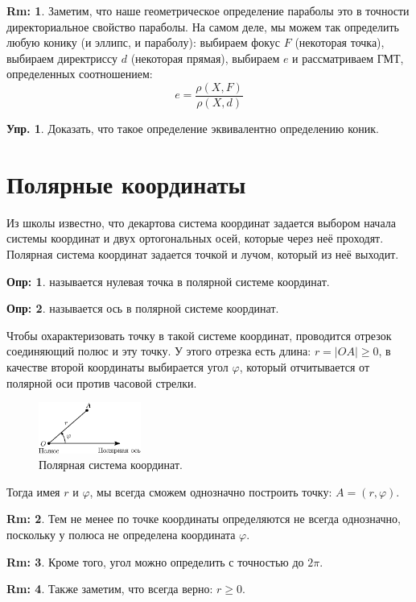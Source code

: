 \documentclass[12pt]{article}
\theoremstyle{definition}
\newtheorem{defn}{Опр:}
\newtheorem{rem}{Rm:}
\newtheorem{exrc}{Упр.}
\begin{document}
\begin{rem}
	Заметим, что наше геометрическое определение параболы это в точности директориальное свойство параболы. На самом деле, мы можем так определить любую конику (и эллипс, и параболу): выбираем фокус $F$ (некоторая точка), выбираем директриссу $d$ (некоторая прямая), выбираем $e$ и рассматриваем ГМТ, определенных соотношением:
	$$
		e = \dfrac{\rho(X,F)}{\rho(X,d)}
	$$
\end{rem}

\begin{exrc}
	Доказать, что такое определение эквивалентно определению коник.
\end{exrc}

\section*{Полярные координаты}

Из школы известно, что декартова система координат задается выбором начала системы координат и двух ортогональных осей, которые через неё проходят. Полярная система координат задается точкой и лучом, который из неё выходит.
\begin{defn}
	 называется нулевая точка в полярной системе координат.
\end{defn}
\begin{defn}
	 называется ось в полярной системе координат.
\end{defn}

Чтобы охарактеризовать точку в такой системе координат, проводится отрезок соединяющий полюс и эту точку. У этого отрезка есть длина: $r = |OA| \geq 0$, в качестве второй координаты выбирается угол $\varphi$, который отчитывается от полярной оси против часовой стрелки.

\begin{figure}[H]
	\centering
	\includegraphics[width=0.3\textwidth]{ANGL3_12.eps}
	\caption{Полярная система координат.}
	\label{3_12}
\end{figure}

Тогда имея $r$ и $\varphi$, мы всегда сможем однозначно построить точку: $A = (r,\varphi)$.
\begin{rem}
	Тем не менее по точке координаты определяются не всегда однозначно, поскольку у полюса не определена координата $\varphi$.
\end{rem}
\begin{rem}
	Кроме того, угол можно определить с точностью до $2\pi$.
\end{rem}
\begin{rem}
	Также заметим, что всегда верно: $r \geq 0$.
\end{rem}
\end{document}

